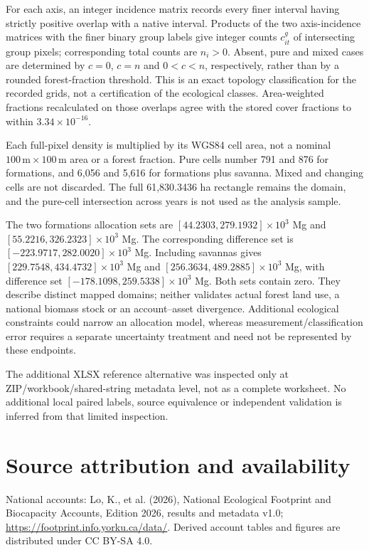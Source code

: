 \documentclass[11pt,a4paper]{article}
\begin{document}
For each axis, an integer incidence matrix records every finer interval having strictly positive overlap with a native interval. Products of the two axis-incidence matrices with the finer binary group labels give integer counts $c_{it}^g$ of intersecting group pixels; corresponding total counts are $n_i>0$. Absent, pure and mixed cases are determined by $c=0$, $c=n$ and $0<c<n$, respectively, rather than by a rounded forest-fraction threshold. This is an exact topology classification for the recorded grids, not a certification of the ecological classes. Area-weighted fractions recalculated on those overlaps agree with the stored cover fractions to within $3.34\times10^{-16}$.

Each full-pixel density is multiplied by its WGS84 cell area, not a nominal $100\,\mathrm m\times100\,\mathrm m$ area or a forest fraction. Pure cells number 791 and 876 for formations, and 6,056 and 5,616 for formations plus savanna. Mixed and changing cells are not discarded. The full 61,830.3436 ha rectangle remains the domain, and the pure-cell intersection across years is not used as the analysis sample.

The two formations allocation sets are $[44.2303,279.1932]\times10^3$ Mg and $[55.2216,326.2323]\times10^3$ Mg. The corresponding difference set is $[-223.9717,282.0020]\times10^3$ Mg. Including savannas gives $[229.7548,434.4732]\times10^3$ Mg and $[256.3634,489.2885]\times10^3$ Mg, with difference set $[-178.1098,259.5338]\times10^3$ Mg. Both sets contain zero. They describe distinct mapped domains; neither validates actual forest land use, a national biomass stock or an account--asset divergence. Additional ecological constraints could narrow an allocation model, whereas measurement/classification error requires a separate uncertainty treatment and need not be represented by these endpoints.

The additional XLSX reference alternative was inspected only at ZIP/workbook/shared-string metadata level, not as a complete worksheet. No additional local paired labels, source equivalence or independent validation is inferred from that limited inspection.

\section*{Source attribution and availability}

National accounts: Lo, K., et al. (2026), National Ecological Footprint and Biocapacity Accounts, Edition 2026, results and metadata v1.0; \url{https://footprint.info.yorku.ca/data/}. Derived account tables and figures are distributed under CC BY-SA 4.0.
\end{document}
